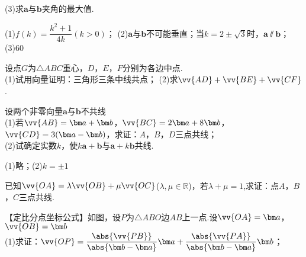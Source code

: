 \begin{Theorem}[平面向量基本定理]
\begin{exercise}
      (3)求$\bm a$与$\bm b$夹角的最大值.
      \begin{answer}
        (1)$f(k)=\dfrac{k^2+1}{4k} (k>0)$；
        (2)$\bm a$与$\bm b$不可能垂直；当$k=2\pm\sqrt{3}$时，$\bm a\varparallel \bm b$；
        (3)60\degree
      \end{answer}
    \vspace{7cm}
    \item
      设点$G$为$\triangle ABC$重心，$D$，$E$，$F$分别为各边中点.\\
      (1)试用向量证明：三角形三条中线共点；
      (2)求$\vv{AD}+\vv{BE}+\vv{CF}$.
      \begin{flushright}
      \end{flushright}
    \vspace{5cm}
    \item%
      设两个非零向量$\bm a$与$\bm b$不共线\\
      (1)若$\vv{AB}=\bm a+\bm b$，$\vv{BC}=2\bm a+8\bm b$，$\vv{CD}=3(\bm a-\bm b)$，求证：$A$，$B$，$D$三点共线；\\
      (2)试确定实数$k$，使$k\bm a+\bm b$与$\bm a+k\bm b$共线.
      \begin{answer}
        (1)略；(2)$k=\pm1$
      \end{answer}
    \vspace{5cm}
    \item
      已知$\vv{OA}=\lambda\vv{OB}+\mu\vv{OC}$($\lambda,\mu\in\mathbb{R}$)，若$\lambda+\mu=1$,求证：点$A$，$B$，$C$三点共线.\\
    \vspace{4cm}
    \item
      【定比分点坐标公式】如图，设$P$为$\triangle ABO$边$AB$上一点.设$\vv{OA}=\bm a$，$\vv{OB}=\bm b$\vspace{8pt}\\
      (1)求证：$\vv{OP}=\dfrac{\abs{\vv{PB}}}{\abs{\bm b-\bm a}}\bm a+\dfrac{\abs{\vv{PA}}}{\abs{\bm b-\bm a}}\bm b$；\vspace{8pt}\\

\end{exercise}
\end{Theorem}
